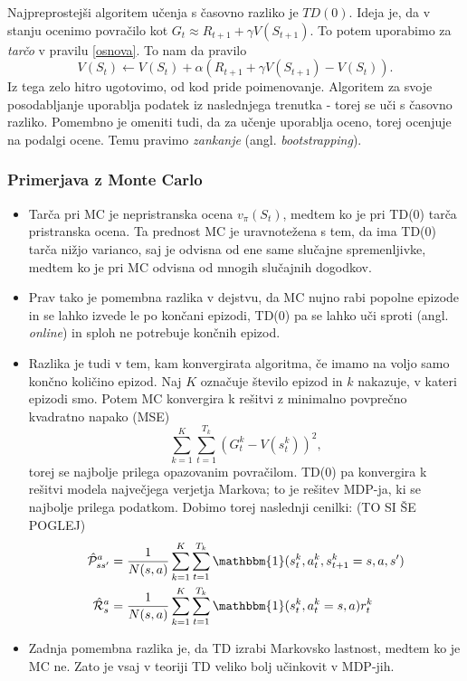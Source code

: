 \documentclass[12pt,a4paper]{amsart}
\theoremstyle{definition} %
\theoremstyle{plain} %
\begin{document}
Najpreprostejši algoritem učenja s časovno razliko je $TD(0)$. Ideja je, da v stanju ocenimo
povračilo kot $G_t \approx R_{t+1} + \gamma V(S_{t+1}).$ To potem uporabimo za \textit{tarčo}
v pravilu \eqref{osnova}. To nam da pravilo
\begin{equation}
    V(S_t) \leftarrow V(S_t) + \alpha (R_{t+1} + \gamma V(S_{t+1}) - V(S_t)).
\end{equation}
Iz tega zelo hitro ugotovimo, od kod pride poimenovanje. Algoritem za svoje posodabljanje uporablja 
podatek iz naslednjega trenutka - torej se uči s časovno razliko. Pomembno je omeniti tudi, da  za 
učenje uporablja oceno, torej ocenjuje na podalgi ocene. Temu pravimo \textit{zankanje} (angl. 
\textit{bootstrapping}).

\subsubsection{Primerjava z Monte Carlo}
\begin{itemize}
    \item Tarča pri MC je nepristranska ocena $v_\pi(S_t)$, medtem ko je pri TD(0) tarča 
    pristranska ocena. Ta prednost MC je uravnotežena s tem, da ima TD(0) tarča nižjo varianco, 
    saj je odvisna od ene same slučajne spremenljivke, medtem ko je pri MC odvisna od mnogih 
    slučajnih dogodkov.
    
    \item Prav tako je pomembna razlika v dejstvu, da MC nujno rabi popolne epizode in se lahko
    izvede le po končani epizodi, TD(0) pa se lahko uči sproti (angl. \textit{online}) in sploh 
    ne potrebuje končnih epizod.

    \item Razlika je tudi v tem, kam konvergirata algoritma, če imamo na voljo samo končno 
    količino epizod. Naj $K$ označuje število epizod in $k$ nakazuje, v kateri epizodi smo. Potem 
    MC konvergira k rešitvi z minimalno povprečno kvadratno napako (MSE) 
    $$
    \sum_{k=1}^K \sum_{t=1}^{T_k} (G_t^k - V(s_t^k))^2,
    $$
    torej se najbolje prilega opazovanim povračilom. TD(0) pa konvergira k rešitvi modela največjega 
    verjetja Markova; to je rešitev MDP-ja, ki se najbolje prilega podatkom. Dobimo torej naslednji 
    cenilki: (TO SI ŠE POGLEJ)
    \begin{align*}
        \hat{\mathcal{P}}_{ss'}^a &= \frac{1}{N(s, a)} \sum_{k=1}^K \sum_{t=1}^{T_k} 
                \mathbbm{1}(s_t^k, a_t^k, s_{t+1}^k = s, a, s') \\
        \hat{\mathcal{R}}_{s}^a &= \frac{1}{N(s, a)} \sum_{k=1}^K \sum_{t=1}^{T_k} 
                \mathbbm{1}(s_t^k, a_t^k = s, a)r_t^k
    \end{align*}

    \item Zadnja pomembna razlika je, da TD izrabi Markovsko lastnost, medtem ko je MC ne. Zato je 
    vsaj v teoriji TD veliko bolj učinkovit v MDP-jih.
\end{itemize}
\end{document}
